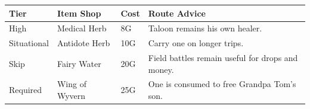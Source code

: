 \documentclass[
  american,
  10pt,
  letterpaper,
  oneside,
  open=any]{scrreprt}
\newcounter{none} %
\newenvironment{guidetable}{%
  \small\setstretch{1.0}%
  \setlength{\tabcolsep}{4pt}%
  \setlength{\LTpre}{8pt}\setlength{\LTpost}{10pt}%
  \renewcommand{\arraystretch}{1.16}%
}{ }
\begin{document}
\begin{guidetable}

{\def\LTcaptype{none} %
\begin{longtable}[]{@{}
  >{\raggedright\arraybackslash}p{}
  >{\raggedright\arraybackslash}p{}
  >{\raggedleft\arraybackslash}p{}
  >{\raggedright\arraybackslash}p{}@{}}
\toprule\noalign{}
\begin{minipage}[b]{\linewidth}\raggedright
\color{GuideGreen}\bfseries Tier
\end{minipage} & \begin{minipage}[b]{\linewidth}\raggedright
\color{GuideGreen}\bfseries Item Shop
\end{minipage} & \begin{minipage}[b]{\linewidth}\raggedleft
\color{GuideGreen}\bfseries Cost
\end{minipage} & \begin{minipage}[b]{\linewidth}\raggedright
\color{GuideGreen}\bfseries Route Advice
\end{minipage} \\
\midrule\noalign{}
\endhead
\bottomrule\noalign{}
\endlastfoot
High & Medical Herb & 8G & Taloon remains his own healer. \\
Situational & Antidote Herb & 10G & Carry one on longer trips. \\
Skip & Fairy Water & 20G & Field battles remain useful for drops and
money. \\
Required & Wing of Wyvern & 25G & One is consumed to free Grandpa Tom's
son. \\
\end{longtable}
}

\end{guidetable}
\end{document}
